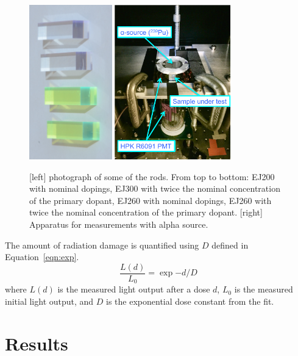 \documentclass[review]{elsarticle}
\begin{document}
\begin{figure}[hbtp]
\centering
\includegraphics[width=0.32\textwidth]{photos_rods.jpg}
\includegraphics[width=0.45\textwidth]{Setup_AlphaSource.pdf}
\caption{
[left] photograph of some of the rods.  From top to bottom: EJ200 with nominal dopings, EJ300 with twice the nominal concentration of the primary dopant, EJ260 with nominal dopings, EJ260 with twice the nominal concentration of the primary dopant.
[right] Apparatus for measurements with alpha source.
}
  \label{fig:hd}
\end{figure}

The amount of radiation damage is quantified 
using $D$ defined in Equation~\ref{eqn:exp}.
\begin{equation}
\frac{L(d)}{L_0}=\exp{-d/D}
\label{eqn:exp}
\end{equation}
where $L(d)$ is the measured light output after a dose $d$, $L_0$ is the measured initial light
output, and $D$ is the exponential dose constant from the fit.


\section{Results}
\end{document}
